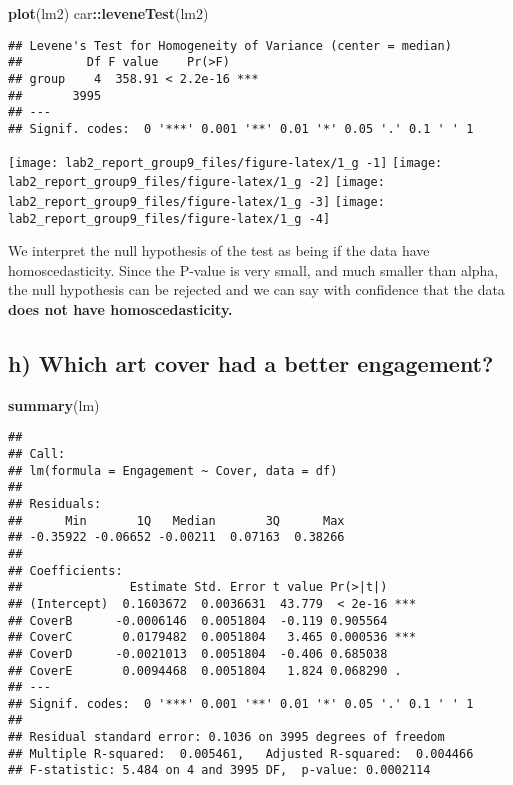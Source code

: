 \documentclass[
]{article}
\newenvironment{Shaded}{\begin{snugshade}}{\end{snugshade}}
\newcommand{\KeywordTok}[1]{\textcolor[rgb]{0.13,0.29,0.53}{\textbf{#1}}}
\newcommand{\NormalTok}[1]{#1}
\newcommand{\OperatorTok}[1]{\textcolor[rgb]{0.81,0.36,0.00}{\textbf{#1}}}
\begin{document}
\begin{Shaded}
\begin{Highlighting}[]
\KeywordTok{plot}\NormalTok{(lm2) }
\NormalTok{car}\OperatorTok{::}\KeywordTok{leveneTest}\NormalTok{(lm2)}
\end{Highlighting}
\end{Shaded}

\begin{verbatim}
## Levene's Test for Homogeneity of Variance (center = median)
##         Df F value    Pr(>F)    
## group    4  358.91 < 2.2e-16 ***
##       3995                      
## ---
## Signif. codes:  0 '***' 0.001 '**' 0.01 '*' 0.05 '.' 0.1 ' ' 1
\end{verbatim}

\texttt{[image: lab2\_report\_group9\_files/figure-latex/1\_g -1]}
\texttt{[image: lab2\_report\_group9\_files/figure-latex/1\_g -2]}
\texttt{[image: lab2\_report\_group9\_files/figure-latex/1\_g -3]}
\texttt{[image: lab2\_report\_group9\_files/figure-latex/1\_g -4]}

We interpret the null hypothesis of the test as being if the data have
homoscedasticity. Since the P-value is very small, and much smaller than
alpha, the null hypothesis can be rejected and we can say with
confidence that the data \textbf{does not have homoscedasticity.}

\hypertarget{h-which-art-cover-had-a-better-engagement}{%
\subsection{h) Which art cover had a better
engagement?}\label{h-which-art-cover-had-a-better-engagement}}

\begin{Shaded}
\begin{Highlighting}[]
\KeywordTok{summary}\NormalTok{(lm)}
\end{Highlighting}
\end{Shaded}

\begin{verbatim}
## 
## Call:
## lm(formula = Engagement ~ Cover, data = df)
## 
## Residuals:
##      Min       1Q   Median       3Q      Max 
## -0.35922 -0.06652 -0.00211  0.07163  0.38266 
## 
## Coefficients:
##               Estimate Std. Error t value Pr(>|t|)    
## (Intercept)  0.1603672  0.0036631  43.779  < 2e-16 ***
## CoverB      -0.0006146  0.0051804  -0.119 0.905564    
## CoverC       0.0179482  0.0051804   3.465 0.000536 ***
## CoverD      -0.0021013  0.0051804  -0.406 0.685038    
## CoverE       0.0094468  0.0051804   1.824 0.068290 .  
## ---
## Signif. codes:  0 '***' 0.001 '**' 0.01 '*' 0.05 '.' 0.1 ' ' 1
## 
## Residual standard error: 0.1036 on 3995 degrees of freedom
## Multiple R-squared:  0.005461,   Adjusted R-squared:  0.004466 
## F-statistic: 5.484 on 4 and 3995 DF,  p-value: 0.0002114
\end{verbatim}
\end{document}
